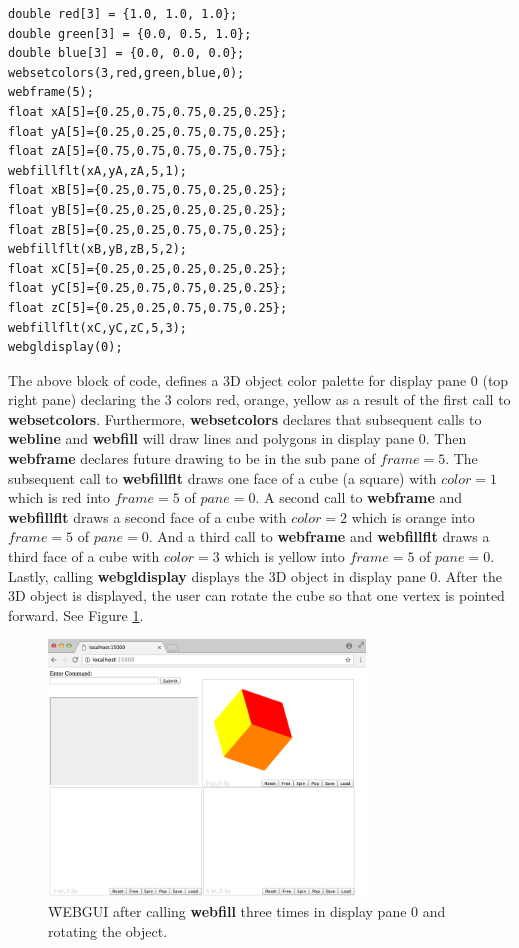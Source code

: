 \begin{verbatim}
double red[3] = {1.0, 1.0, 1.0};
double green[3] = {0.0, 0.5, 1.0};
double blue[3] = {0.0, 0.0, 0.0};
websetcolors(3,red,green,blue,0);
webframe(5);
float xA[5]={0.25,0.75,0.75,0.25,0.25};
float yA[5]={0.25,0.25,0.75,0.75,0.25};
float zA[5]={0.75,0.75,0.75,0.75,0.75};
webfillflt(xA,yA,zA,5,1);
float xB[5]={0.25,0.75,0.75,0.25,0.25};
float yB[5]={0.25,0.25,0.25,0.25,0.25};
float zB[5]={0.25,0.25,0.75,0.75,0.25};
webfillflt(xB,yB,zB,5,2);
float xC[5]={0.25,0.25,0.25,0.25,0.25};
float yC[5]={0.25,0.75,0.75,0.25,0.25};
float zC[5]={0.25,0.25,0.75,0.75,0.25};
webfillflt(xC,yC,zC,5,3);
webgldisplay(0);
\end{verbatim}
The above block of code, defines a 3D object color palette for display pane 0 (top right pane) declaring the 3 colors red, orange, yellow as a result of the first call to 
\textbf{websetcolors}. Furthermore, \textbf{websetcolors} declares that subsequent calls to \textbf{webline} and \textbf{webfill} will draw lines and polygons 
in display pane 0. Then \textbf{webframe} declares future drawing to be in the sub pane of $frame=5$. The subsequent call to \textbf{webfillflt} draws one
face of a cube (a square) with $color=1$ which is red into $frame=5$ of $pane=0$. A second call to \textbf{webframe} and \textbf{webfillflt} draws a second face of a cube
with $color=2$ which is orange into $frame=5$ of $pane=0$. And a third call to  \textbf{webframe} and \textbf{webfillflt} draws a third face of a cube with $color=3$ 
which is yellow into $frame=5$ of $pane=0$. Lastly, calling \textbf{webgldisplay} displays the 3D object in display pane 0. After the 3D object is displayed,
the user can rotate the cube so that one vertex is pointed forward. See Figure \ref{fig:11}.
\begin{figure}[H]
\centering
\includegraphics[width=0.75\textwidth]{pix/cube.png}
\caption{\f{WEBGUI} after calling \textbf{webfill} three times in display pane 0 and rotating the object.}
\label{fig:11}
\end{figure} 

